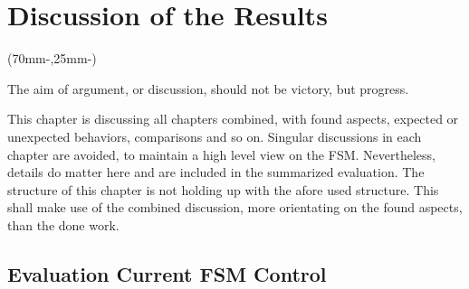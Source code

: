 

\chapter{Discussion of the Results}
\label{chap:discussion}

\begin{textblock*}{.7\textwidth}(70mm-\offset,25mm-\offset)
    \begin{fquote}
        The aim of argument, or discussion, should not be victory, but progress.
    \end{fquote}
\end{textblock*}

This chapter is discussing all chapters combined, with found aspects, expected or unexpected behaviors, comparisons and so on.
Singular discussions in each chapter are avoided, to maintain a high level view on the \acf{FSM}.
Nevertheless, details do matter here and are included in the summarized evaluation.
The structure of this chapter is not holding up with the afore used structure.
This shall make use of the combined discussion, more orientating on the found aspects, than the done work. 

\section{Evaluation Current FSM Control}



